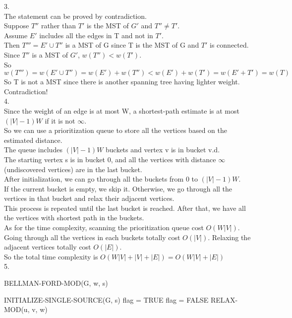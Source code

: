 \documentclass{article}
\begin{document}
3. \\
The statement can be proved by contradiction.\\
Suppose $T''$ rather than $T'$ is the MST of $G'$ and $T'' \neq T'$.\\
Assume $E'$ includes all the edges in T and not in $T'$.\\
Then $T''' = E' \cup T''$ is a MST of G since T is the MST of G and $T'$ is connected.\\
Since $T''$ is a MST of $G'$, $w(T'') < w(T')$.\\
So $w(T''') = w(E' \cup T'') = w(E') + w(T'') < w(E') + w(T') = w(E' + T') = w(T)$\\
So T is not a MST since there is another spanning tree having lighter weight.\\
Contradiction!\\

4.\\
Since the weight of an edge is at most W, a shortest-path estimate is at most $(|V| - 1)W$ if it is not $\infty$.\\
So we can use a prioritization queue to store all the vertices based on the estimated distance.\\
The queue includes $(|V| - 1)W$ buckets and vertex v is in bucket v.d.\\
The starting vertex s is in bucket 0, and all the vertices with distance $\infty$(undiscovered vertices) are in the last bucket.\\
After initialization, we can go through all the buckets from 0 to $(|V| - 1)W$.\\
If the current bucket is empty, we skip it. Otherwise, we go through all the vertices in that bucket and relax their adjacent vertices.\\
This process is repeated until the last bucket is reached. After that, we have all the vertices with shortest path in the buckets.\\
As for the time complexity, scanning the prioritization queue cost $O(W|V|)$. Going through all the vertices in each buckets totally cost $O(|V|)$.
Relaxing the adjacent vertices totally cost $O(|E|)$.\\
So the total time complexity is $O(W|V| + |V| + |E|)=O(W|V| + |E|)$\\

5.\\
\begin{algorithm}[H]
	\caption{BELLMAN-FORD-MOD(G, w, s)}
	INITIALIZE-SINGLE-SOURCE(G, s)\;
	flag = TRUE\;
	{
		flag = FALSE\;
		{
			RELAX-MOD(u, v, w)
		}
	}
\end{algorithm}
\end{document}
